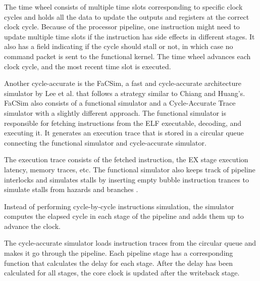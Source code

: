 The time wheel consists of multiple time slots corresponding to specific clock cycles and holds all the data to update the outputs and registers at the correct clock cycle. Because of the processor pipeline, one instruction might need to update multiple time slots if the instruction has side effects in different stages. It also has a field indicating if the cycle should stall or not, in which case no command packet is sent to the functional kernel. The time wheel advances each clock cycle, and the most recent time slot is executed.

Another cycle-accurate is the FaCSim, a fast and cycle-accurate architecture simulator by Lee et al. that follows a strategy similar to Chiang and Huang's. FaCSim also consists of a functional simulator and a Cycle-Accurate Trace simulator with a slightly different approach. The functional simulator is responsible for fetching instructions from the ELF executable, decoding, and executing it. It generates an execution trace that is stored in a circular queue connecting the functional simulator and cycle-accurate simulator. \cite{leeFaCSimFastCycleAccurate2008}

The execution trace consists of the fetched instruction, the EX stage execution latency, memory traces, etc. The functional simulator also keeps track of pipeline interlocks and simulates stalls by inserting empty bubble instruction trances to simulate stalls from hazards and branches \cite{leeFaCSimFastCycleAccurate2008}.

Instead of performing cycle-by-cycle instructions simulation, the simulator computes the elapsed cycle in each stage of the pipeline and adds them up to advance the clock. 

The cycle-accurate simulator loads instruction traces from the circular queue and makes it go through the pipeline. Each pipeline stage has a corresponding function that calculates the delay for each stage. After the delay has been calculated for all stages, the core clock is updated after the writeback stage. 
\cite{leeFaCSimFastCycleAccurate2008}

